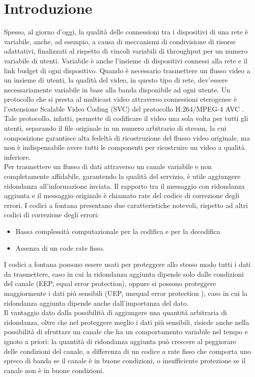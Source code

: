 \documentclass[italian, a4paper, 12pt]{article}
\begin{document}
\section{Introduzione} %
Spesso, al giorno d'oggi, la qualità delle connessioni tra i dispositivi di una rete è variabile, anche, ad esempio, a causa di meccanismi di condivisione di risorse adattativi, finalizzati al rispetto di vincoli variabili di throughput per un numero variabile di utenti. Variabile è anche l'insieme di dispositivi connessi alla rete e il link budget di ogni dispositivo. Quando è necessario trasmettere un flusso video a un insieme di utenti, la qualità del video, in questo tipo di rete, dev'essere necessariamente variabile in base alla banda disponibile ad ogni utente. Un protocollo che si presta al multicast video attraverso connessioni eterogenee è l'estensione Scalable Video Coding (SVC) del protocollo H.264/MPEG-4 AVC \cite{svc}. Tale protocollo, infatti, permette di codificare il video una sola volta per tutti gli utenti, separando il file originale in un numero arbitrario di stream, la cui composizione garantisce alta fedeltà di ricostruzione del flusso video originale, ma non è indispensabile avere tutti le componenti per ricostruire un video a qualità inferiore.\\
Per trasmettere un flusso di dati attraverso un canale variabile e non completamente affidabile, garantendo la qualità del servizio, è utile aggiungere ridondanza all'informazione inviata. Il rapporto tra il messaggio con ridondanza aggiunta e il messaggio originale è chiamato rate del codice di correzione degli errori.
I codici a fontana \cite{fcsurvey, rossifc} presentano due caratteristiche notevoli, rispetto ad altri codici di correzione degli errori:
\begin{itemize}
\item Bassa complessità computazionale per la codifica e per la decodifica
\item Assenza di un code rate fisso.
\end{itemize}
I codici a fontana possono essere usati per proteggere allo stesso modo tutti i dati da trasmettere, caso in cui la ridondanza aggiunta dipende solo dalle condizioni del canale (EEP, equal error protection), oppure si possono proteggere maggiormente i dati più sensibili (UEP, unequal error protection \cite{uep}), caso in cui la ridondanza aggiunta dipende anche dall'importanza del dato.\\
Il vantaggio dato dalla possibilità di aggiungere una quantità arbitraria di ridondanza, oltre che nel proteggere meglio i dati più sensibili, risiede anche nella possibilità di sfruttare un canale che ha un comportamento variabile nel tempo e ignoto a priori: la quantità di ridondanza aggiunta può crescere al peggiorare delle condizioni del canale, a differenza di un codice a rate fisso che comporta uno spreco di banda se il canale è in buone condizioni, o insufficiente protezione se il canale non è in buone condizioni.
\end{document}
